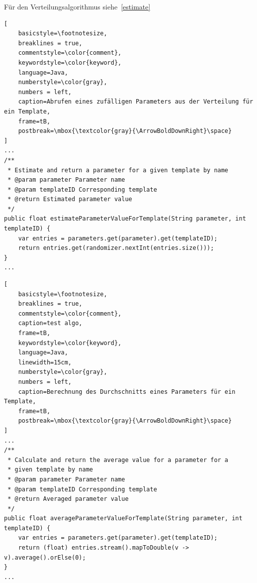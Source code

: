 Für den Verteilungsalgorithmus siehe~\ref{estimate}

\begin{lstlisting}[
    basicstyle=\footnotesize,
    breaklines = true,
    commentstyle=\color{comment},
    keywordstyle=\color{keyword},
    language=Java,
    numberstyle=\color{gray},
    numbers = left,
    caption=Abrufen eines zufälligen Parameters aus der Verteilung für ein Template,
    frame=tB,
    postbreak=\mbox{\textcolor{gray}{\ArrowBoldDownRight}\space}
]
...
/**
 * Estimate and return a parameter for a given template by name
 * @param parameter Parameter name
 * @param templateID Corresponding template
 * @return Estimated parameter value
 */
public float estimateParameterValueForTemplate(String parameter, int templateID) {
    var entries = parameters.get(parameter).get(templateID);
    return entries.get(randomizer.nextInt(entries.size()));
}
...
\end{lstlisting}

\newpage

\begin{lstlisting}[
    basicstyle=\footnotesize,
    breaklines = true,
    commentstyle=\color{comment},
    caption=test algo,
    frame=tB,
    keywordstyle=\color{keyword},
    language=Java,
    linewidth=15cm,
    numberstyle=\color{gray},
    numbers = left,
    caption=Berechnung des Durchschnitts eines Parameters für ein Template,
    frame=tB,
    postbreak=\mbox{\textcolor{gray}{\ArrowBoldDownRight}\space}
]
...
/**
 * Calculate and return the average value for a parameter for a
 * given template by name
 * @param parameter Parameter name
 * @param templateID Corresponding template
 * @return Averaged parameter value
 */
public float averageParameterValueForTemplate(String parameter, int templateID) {
    var entries = parameters.get(parameter).get(templateID);
    return (float) entries.stream().mapToDouble(v -> v).average().orElse(0);
}
...
\end{lstlisting}